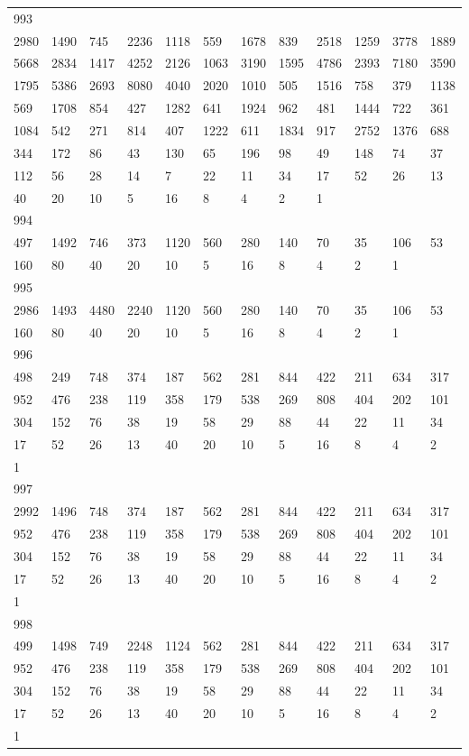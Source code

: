 \begin{longtable}{llllllllllll}
993&&&&&&&&&&&\\
2980& 1490& 745& 2236& 1118& 559& 1678& 839& 2518& 1259& 3778& 1889\\
5668& 2834& 1417& 4252& 2126& 1063& 3190& 1595& 4786& 2393& 7180& 3590\\
1795& 5386& 2693& 8080& 4040& 2020& 1010& 505& 1516& 758& 379& 1138\\
569& 1708& 854& 427& 1282& 641& 1924& 962& 481& 1444& 722& 361\\
1084& 542& 271& 814& 407& 1222& 611& 1834& 917& 2752& 1376& 688\\
344& 172& 86& 43& 130& 65& 196& 98& 49& 148& 74& 37\\
112& 56& 28& 14& 7& 22& 11& 34& 17& 52& 26& 13\\
40& 20& 10& 5& 16& 8& 4& 2& 1& \\

994&&&&&&&&&&&\\
497& 1492& 746& 373& 1120& 560& 280& 140& 70& 35& 106& 53\\
160& 80& 40& 20& 10& 5& 16& 8& 4& 2& 1& \\

995&&&&&&&&&&&\\
2986& 1493& 4480& 2240& 1120& 560& 280& 140& 70& 35& 106& 53\\
160& 80& 40& 20& 10& 5& 16& 8& 4& 2& 1& \\

996&&&&&&&&&&&\\
498& 249& 748& 374& 187& 562& 281& 844& 422& 211& 634& 317\\
952& 476& 238& 119& 358& 179& 538& 269& 808& 404& 202& 101\\
304& 152& 76& 38& 19& 58& 29& 88& 44& 22& 11& 34\\
17& 52& 26& 13& 40& 20& 10& 5& 16& 8& 4& 2\\
1& \\

997&&&&&&&&&&&\\
2992& 1496& 748& 374& 187& 562& 281& 844& 422& 211& 634& 317\\
952& 476& 238& 119& 358& 179& 538& 269& 808& 404& 202& 101\\
304& 152& 76& 38& 19& 58& 29& 88& 44& 22& 11& 34\\
17& 52& 26& 13& 40& 20& 10& 5& 16& 8& 4& 2\\
1& \\

998&&&&&&&&&&&\\
499& 1498& 749& 2248& 1124& 562& 281& 844& 422& 211& 634& 317\\
952& 476& 238& 119& 358& 179& 538& 269& 808& 404& 202& 101\\
304& 152& 76& 38& 19& 58& 29& 88& 44& 22& 11& 34\\
17& 52& 26& 13& 40& 20& 10& 5& 16& 8& 4& 2\\
1& \\


\end{longtable}
